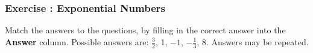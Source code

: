             \subsubsection{  Exercise : Exponential Numbers }
            \nopagebreak
        \label{m38359*id67549}Match the answers to the questions, by filling in the correct answer into the \textbf{Answer} column.
Possible answers are: \begin{math}\frac{3}{2}\end{math}, 1, \begin{math}-1\end{math}, \begin{math}-\frac{1}{3}\end{math}, 8. Answers may be repeated.\par 
    \setlength\mytablespace{4\tabcolsep}
    \addtolength\mytablespace{3\arrayrulewidth}
    \setlength\mytablewidth{\linewidth}
    \setlength\mytableroom{\mytablewidth}
    \addtolength\mytableroom{-\mytablespace}
    \setlength\myfixedwidth{0pt}
    \setlength\mystarwidth{\mytableroom}
        \addtolength\mystarwidth{-\myfixedwidth}
        \divide{}
